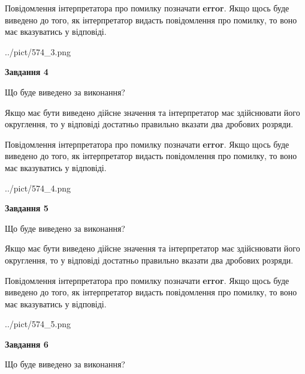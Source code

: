 \documentclass[12pt, ukrainian]{article}
\begin{document}
{\begin {Large}
Повідомлення інтерпретатора про помилку позначати \textbf{error}.
Якщо щось буде виведено до того, як інтерпретатор видасть повідомлення про помилку, 
то воно має вказуватись у відповіді. \par

\begin{center}
	{../pict/574_3.png}
\end{center}
\newpage

{\begin {center}\textbf{Завдання 4}\end {center}}\par
Що буде виведено за виконання? \par

Якщо має бути виведено дійсне значення та інтерпретатор має здійснювати його округлення, 
то у відповіді достатньо правильно вказати два дробових розряди.

Повідомлення інтерпретатора про помилку позначати \textbf{error}.
Якщо щось буде виведено до того, як інтерпретатор видасть повідомлення про помилку, 
то воно має вказуватись у відповіді. \par

\begin{center}
	{../pict/574_4.png}
\end{center}
\newpage

{\begin {center}\textbf{Завдання 5}\end {center}}\par
Що буде виведено за виконання? \par

Якщо має бути виведено дійсне значення та інтерпретатор має здійснювати його округлення, 
то у відповіді достатньо правильно вказати два дробових розряди.

Повідомлення інтерпретатора про помилку позначати \textbf{error}.
Якщо щось буде виведено до того, як інтерпретатор видасть повідомлення про помилку, 
то воно має вказуватись у відповіді. \par

\begin{center}
	{../pict/574_5.png}
\end{center}
\newpage

{\begin {center}\textbf{Завдання 6}\end {center}}\par
Що буде виведено за виконання? \par


\end{Large}}
\end{document}
